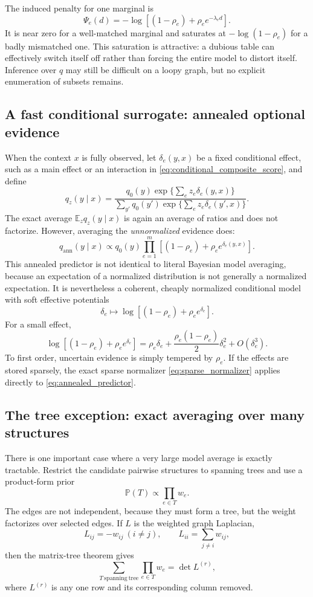 \documentclass[11pt]{article}
\newcommand{\E}{\mathbb E}
\newcommand{\Pp}{\mathbb P}
\newcommand{\1}{\mathbf 1}
\begin{document}
The induced penalty for one marginal is
\[
  \Psi_e(d)
  =
  -\log\left[
    (1-\rho_e)+\rho_e e^{-\lambda_e d}
  \right].
\]
It is near zero for a well-matched marginal and saturates at
\(-\log(1-\rho_e)\) for a badly mismatched one.  This saturation is attractive:
a dubious table can effectively switch itself off rather than forcing the
entire model to distort itself.  Inference over \(q\) may still be difficult
on a loopy graph, but no explicit enumeration of subsets remains.

\subsection{A fast conditional surrogate: annealed optional evidence}

When the context \(x\) is fully observed, let \(\delta_e(y,x)\) be a fixed
conditional effect, such as a main effect or an interaction in
\eqref{eq:conditional_composite_score}, and define
\[
  q_z(y\mid x)
  =
  \frac{
    q_0(y)\exp\{\sum_e z_e\delta_e(y,x)\}
  }{
    \sum_{y'}q_0(y')\exp\{\sum_e z_e\delta_e(y',x)\}
  }.
\]
The exact average \(\E_z q_z(y\mid x)\) is again an average of ratios and does
not factorize.  However, averaging the \emph{unnormalized} evidence does:
\begin{equation}
  q_{\mathrm{ann}}(y\mid x)
  \propto
  q_0(y)
  \prod_{e=1}^m
  \left[
    (1-\rho_e)+\rho_e e^{\delta_e(y,x)}
  \right].
  \label{eq:annealed_predictor}
\end{equation}
This annealed predictor is not identical to literal Bayesian model averaging,
because an expectation of a normalized distribution is not generally a
normalized expectation.  It is nevertheless a coherent, cheaply normalized
conditional model with soft effective potentials
\[
  \delta_e
  \longmapsto
  \log\left[(1-\rho_e)+\rho_e e^{\delta_e}\right].
\]
For a small effect,
\[
  \log\left[(1-\rho_e)+\rho_e e^{\delta_e}\right]
  =
  \rho_e\delta_e
  +
  \frac{\rho_e(1-\rho_e)}{2}\delta_e^2
  +O(\delta_e^3).
\]
To first order, uncertain evidence is simply tempered by \(\rho_e\).  If the
effects are stored sparsely, the exact sparse normalizer
\eqref{eq:sparse_normalizer} applies directly to
\eqref{eq:annealed_predictor}.

\subsection{The tree exception: exact averaging over many structures}

There is one important case where a very large model average is exactly
tractable.  Restrict the candidate pairwise structures to spanning trees and
use a product-form prior
\[
  \Pp(T)
  \propto
  \prod_{e\in T}w_e.
\]
The edges are not independent, because they must form a tree, but the weight
factorizes over selected edges.  If \(L\) is the weighted graph Laplacian,
\[
  L_{ij}=-w_{ij}\ (i\ne j),\qquad
  L_{ii}=\sum_{j\ne i}w_{ij},
\]
then the matrix-tree theorem gives
\begin{equation}
  \sum_{T\ \mathrm{spanning\ tree}}\prod_{e\in T}w_e
  =
  \det L^{(r)},
  \label{eq:matrix_tree}
\end{equation}
where \(L^{(r)}\) is any one row and its corresponding column removed.
\end{document}
